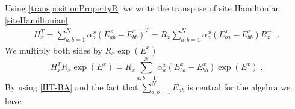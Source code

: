 \documentclass[10pt]{article}
\numberwithin{equation}{section}
\numberwithin{equation}{subsection}
\newcommand{\dt}{\;.}
\begin{document}
Using \eqref{transpositionPropertyR} we write the transpose of site Hamiltonian \eqref{siteHamiltonian} 
\begin{equation}
    \begin{split}
H_{x}^{T}=\sum_{a,b=1}^{N}\alpha_{a}^{x}\left(E_{ab}^{x}-E_{bb}^{x}\right)^{T}=R_{x}\sum_{a,b=1}^{N}\alpha_{a}^{x}\left(E_{b a}^{x}-E_{bb}^{x}\right)R_{x}^{-1}\dt
    \end{split}
\end{equation}
We multiply both sides by $R_{x}\exp{(E^{x})}$
\begin{equation}\label{intermediateTransposeSite}
    H_{x}^{T}R_{x}\exp{(E^{x})}=R_{x}\sum_{a,b =1}^{N}\alpha_{a}^{x}\left(E_{b a}^{x}-E_{bb}^{x}\right)\exp{(E^{x})}\dt
\end{equation}
By using \eqref{HT-BA} and the fact that 
$\sum_{a,b=1}^{N}E_{ab}$ is central for the algebra we have 
\end{document}
